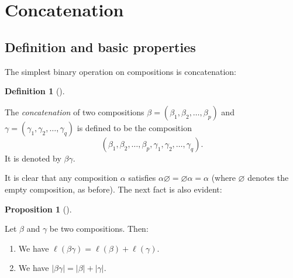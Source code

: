 \documentclass[numbers=enddot,12pt,final,onecolumn,notitlepage]{scrartcl}%
\theoremstyle{definition}
\newtheorem{prop}[theo]{Proposition}
\newenvironment{proposition}[1][]
{\begin{prop}[#1]\begin{leftbar}}
{\end{leftbar}\end{prop}}
\newtheorem{defi}[theo]{Definition}
\newenvironment{definition}[1][]
{\begin{defi}[#1]\begin{leftbar}}
{\end{leftbar}\end{defi}}
\begin{document}
\section{Concatenation}

\subsection{Definition and basic properties}

The simplest binary operation on compositions is concatenation:

\begin{definition}
\label{def.concat}The \emph{concatenation} of two compositions $\beta=\left(
\beta_{1},\beta_{2},\ldots,\beta_{p}\right)  $ and $\gamma=\left(  \gamma
_{1},\gamma_{2},\ldots,\gamma_{q}\right)  $ is defined to be the composition
\[
\left(  \beta_{1},\beta_{2},\ldots,\beta_{p},\gamma_{1},\gamma_{2}%
,\ldots,\gamma_{q}\right)  .
\]
It is denoted by $\beta\gamma$.
\end{definition}

It is clear that any composition $\alpha$ satisfies $\alpha\varnothing
=\varnothing\alpha=\alpha$ (where $\varnothing$ denotes the empty composition,
as before). The next fact is also evident:

\begin{proposition}
\label{prop.concat.lsize}Let $\beta$ and $\gamma$ be two compositions. Then:

\begin{enumerate}
\item[\textbf{(a)}] We have $\ell\left(  \beta\gamma\right)  =\ell\left(
\beta\right)  +\ell\left(  \gamma\right)  $.

\item[\textbf{(b)}] We have $\left\vert \beta\gamma\right\vert =\left\vert
\beta\right\vert +\left\vert \gamma\right\vert $.
\end{enumerate}
\end{proposition}
\end{document}
